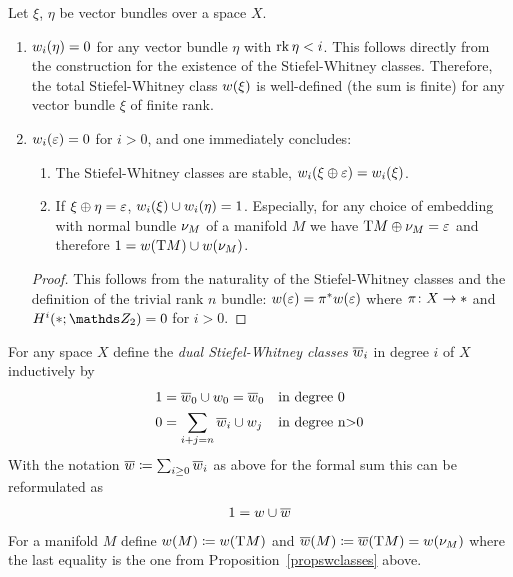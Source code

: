 \begin{Rem} %
  \label{propswclasses}
  Let $\xi$, $\eta$ be vector bundles over a space $X$.
  \begin{enumerate} 
  \item $w_i(\eta) = 0$
    for any vector bundle $\eta$ with $\operatorname{rk}\eta < i$.
    This follows directly from the construction for the existence of
    the Stiefel-Whitney classes.
    Therefore, the total Stiefel-Whitney class $w(\xi)$ is
    well-defined (\idest the sum is finite)
    for any vector bundle $\xi$ of finite rank.
  \item $w_i(\varepsilon)=0$ for $i>0$, and one immediately concludes:
    \begin{enumerate}
    \item The Stiefel-Whitney classes are stable, \idest
      $w_i(\xi\oplus\varepsilon) = w_i(\xi)$.
    \item If $\xi\oplus\eta = \varepsilon$, $w_i(\xi)\cup w_i(\eta)=1$.
      Especially, for any choice of embedding with normal bundle $\nu_{M}$
      of a manifold $M$ we have $\mathrm{T}M \oplus \nu_{M} = \varepsilon$ and
      therefore $1 = w(\mathrm{T}M) \cup w(\nu_{M})$.
    \end{enumerate}
    \begin{proof} %
      This follows from the naturality of the Stiefel-Whitney classes
      and the definition of the trivial rank $n$ bundle:
      $w(\varepsilon) = {\pi}^* w(\varepsilon)$ where $\pi\colon X\to*$
      and $H^i(\pt;\Zmod2) = 0$ for $i>0$.
    \end{proof}
  \end{enumerate}
\end{Rem}

\begin{Def}
  For any space $X$ define the \emph{dual Stiefel-Whitney classes}
  $\overline{w}_i$ in degree $i$ of $X$ inductively by
  \begin{align*}
    1 &= \overline{w}_0\cup w_0 = \overline{w}_0    &&\text{in degree 0}\\
    0 &= \sum_{i+j=n} \overline{w}_i\cup w_j  &&\text{in degree n>0}
  \end{align*}
  With the notation $\overline{w}\coloneqq \sum_{i\geq0} \overline{w}_i$ as above
  for the formal sum this can be reformulated as
  \begin{gather*}
    1 = w\cup\overline{w}
  \end{gather*}
  For a manifold $M$ define
  $w(M) \coloneqq w(\mathrm{T}M)$ and
  $\overline{w}(M) \coloneqq \overline{w}(\mathrm{T}M) = w(\nu_{M})$
  where the last equality is the one from
  Proposition~\ref{propswclasses} above.
\end{Def}


